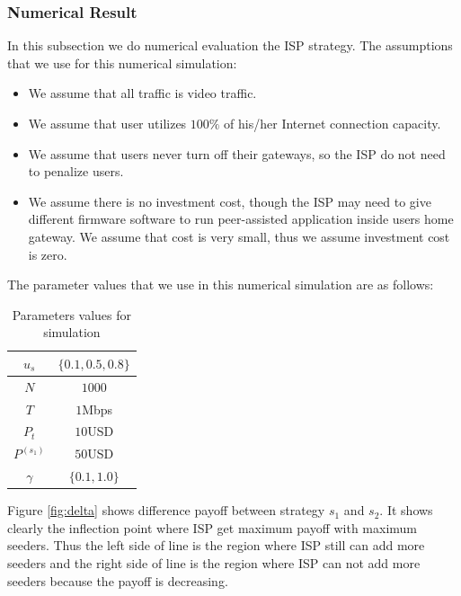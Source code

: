 \documentclass[paper]{ieice}
\begin{document}
\subsubsection{Numerical Result}
In this subsection we do numerical evaluation the ISP strategy.
The assumptions that we use for this numerical simulation:
\begin{itemize}
	\item We assume that all traffic is video traffic.
	\item We assume that user utilizes $100\%$ of his/her Internet connection capacity.  
	\item We assume that users never turn off their gateways, so the ISP do not need to penalize users.
	\item We assume there is no investment cost, though the ISP may need to give different firmware software to run peer-assisted application inside users home gateway. We assume that cost is very small, thus we assume investment cost is zero.
\end{itemize}

The parameter values that we use in this numerical simulation are as follows:
\begin{table}[thb]%
\caption{Parameters values for simulation}
\label{table:1}
\begin{center}
\begin{tabular}{c|c}
\hline
$u_s$ & $\{0.1, 0.5, 0.8\}$ \\
\hline
$N$ & $1000$\\
\hline
$T$ & $1$Mbps \\
\hline
$P_t$ & $10$USD \\
\hline
$P^{(s_1)}$ & $50$USD\\
\hline
$\gamma$ & $\{0.1,1.0\}$ \\
\hline
\end{tabular}
\end{center}
\end{table}

Figure \ref{fig:delta} shows difference payoff between strategy $s_1$ and $s_2$.
It shows clearly the inflection point where ISP get maximum payoff with maximum seeders. 
Thus the left side of line is the region where ISP still can add more seeders and the right side of line is the region where ISP can not add more seeders because the payoff is decreasing.
\end{document}
